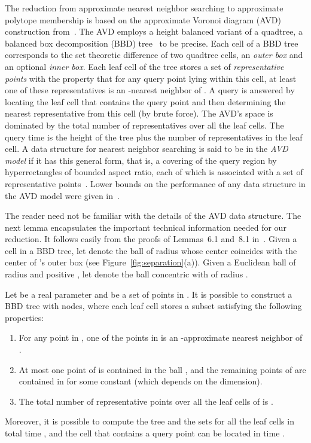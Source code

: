 \documentclass[11pt]{article}   \usepackage[letterpaper,hmargin=2.1cm,vmargin=3cm]{geometry}
\begin{document}
The reduction from approximate nearest neighbor searching to approximate polytope membership is based on the approximate Voronoi diagram (AVD) construction from~\cite{AVD-JACM}. The AVD employs a height balanced variant of a quadtree, a balanced box decomposition (BBD) tree~\cite{ARS} to be precise. Each cell of a BBD tree corresponds to the set theoretic difference of two quadtree cells, an \emph{outer box} and an optional \emph{inner box}. Each leaf cell of the tree stores a set of \emph{representative points} with the property that for any query point  lying within this cell, at least one of these representatives is an -nearest neighbor of . A query is answered by locating the leaf cell that contains the query point and then determining the nearest representative from this cell (by brute force). The AVD's space is dominated by the total number of representatives over all the leaf cells. The query time is the height of the tree plus the number of representatives in the leaf cell. A data structure for nearest neighbor searching is said to be in the \emph{AVD model} if it has this general form, that is, a covering of the query region by hyperrectangles of bounded aspect ratio, each of which is associated with a set of representative points~\cite{AVD-JACM}. Lower bounds on the performance of any data structure in the AVD model were given in~\cite{AVD-JACM}.

The reader need not be familiar with the details of the AVD data structure. The next lemma encapsulates the important technical information needed for our reduction. It follows easily from the proofs of Lemmas~{6.1} and~{8.1} in~\cite{AVD-JACM}. Given a cell  in a BBD tree, let  denote the ball of radius  whose center coincides with the center of 's outer box (see Figure~\ref{fig:separation}(a)). Given a Euclidean ball  of radius  and positive , let  denote the ball concentric with  of radius .

\begin{lemma} \label{lem:avd}
Let  be a real parameter and  be a set of  points in . It is possible to construct a BBD tree  with  nodes, where each leaf cell  stores a subset  satisfying the following properties:

\begin{enumerate}
\setlength{\itemsep}{-0.5ex}\setlength{\parsep}{0pt}\item[] For any point  in , one of the points in  is an -approximate nearest neighbor of .

\item[] At most one point of  is contained in the ball , and the remaining points of  are contained in  for some constant  (which depends on the dimension).

\item[] The total number of representative points over all the leaf cells of  is .
\end{enumerate}

Moreover, it is possible to compute the tree  and the sets  for all the leaf cells in total time , and the cell that contains a query point can be located in time .
\end{lemma}
\end{document}
